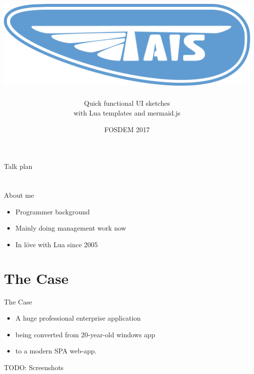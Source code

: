 \documentclass[aspectratio=43,handout,bigger]{beamer}
\title{\includegraphics[height=.15\textheight]{logo}}
\author{Quick functional UI sketches\\with Lua templates and mermaid.js}
\institute{Alexander Gladysh\\@agladysh}
\date{FOSDEM 2017}
\begin{document}
\begin{frame}[plain]
 \titlepage
\end{frame}


\begin{frame}{Talk plan}

\tableofcontents

\end{frame}


\section*{}

\begin{frame}{About me}

\begin{itemize}
\item Programmer background
\item Mainly doing management work now
\item In löve with Lua since 2005
\end{itemize}

\end{frame}


\section{The Case}


\begin{frame}{The Case}
  \begin{itemize}
    \item A huge professional enterprise application
    \item being converted from 20-year-old windows app
    \item to a modern SPA web-app.
  \end{itemize}

  TODO: Screenshots
\end{frame}

\end{document}
